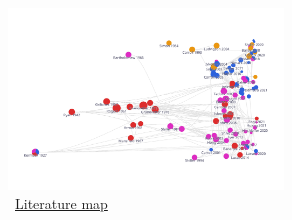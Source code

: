 \begin{figure}[!ht] \centering  %
	\caption{ ~\href{https://app.litmaps.co/shared/0E6D51EB-462D-4F34-8BA2-27925D44DB8F}{Literature map}}
	\label{fig:graph_mixer}
	\centerline{\includegraphics[width=0.65\textwidth]{./figures/graph_mixer}}
\end{figure}